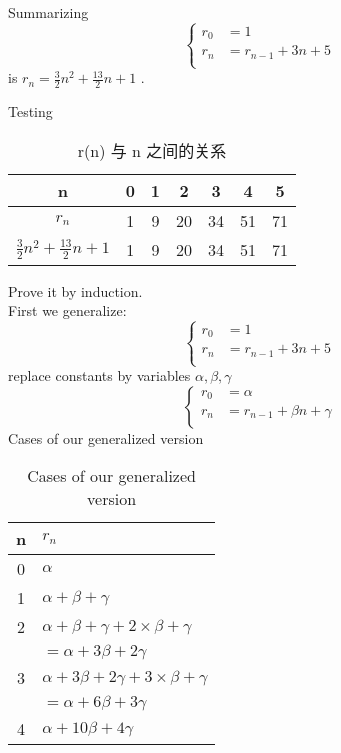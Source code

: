 \documentclass[mode=geye]{elegantnote}
\begin{document}
Summarizing 
\begin{equation*}
    \left\{
        \begin{array}{ll}
            r_0 &= 1\\
            r_n &= r_{n-1}+3n+5\\
        \end{array}
    \right.
\end{equation*}
is $ r_n=\frac{3}{2}n^2+\frac{13}{2}n+1 $ .

Testing
\begin{table}[htbp]
	\centering
	\small
	\caption{r(n) 与 n 之间的关系}
	\begin{tabular}{c|ccc ccc}
		\toprule
		n & 0 & 1 & 2 & 3 & 4 & 5 \\  
		\midrule
		$ r_n $ & 1 & 9 & 20 & 34 & 51 & 71\\
        $ \frac{3}{2}n^2+\frac{13}{2}n+1 $ & 1 & 9 & 20 & 34 & 51 & 71\\
		\bottomrule
	\end{tabular}%
	\label{tab:rnCompare}%
\end{table}%

Prove it by induction.\\
First we generalize:
\begin{equation*}
    \left\{
        \begin{array}{ll}
            r_0 &= 1\\
            r_n &= r_{n-1}+3n+5\\
        \end{array}
    \right.
\end{equation*}
replace constants by variables $ \alpha, \beta,\gamma $ 
\begin{equation*}
    \left\{
        \begin{array}{ll}
            r_0 &= \alpha\\
            r_n &= r_{n-1}+\beta n+\gamma\\
        \end{array}
    \right.
\end{equation*}
Cases of our generalized version
\begin{table}[htbp]
	\centering
	\small
	\caption{Cases of our generalized version}
	\begin{tabular}{cl}
		\toprule
		n & $ r_n $ \\  
		\midrule
        0   & $ \alpha $     \\
        1   & $ \alpha + \beta + \gamma $    \\
        2   & $ \alpha + \beta + \gamma + 2\times \beta + \gamma  $   \\
            & $ = \alpha + 3\beta + 2\gamma $ \\
        3   & $ \alpha + 3\beta + 2\gamma + 3\times \beta + \gamma $ \\
            & $ = \alpha + 6\beta + 3\gamma $   \\
        4   & $ \alpha + 10\beta + 4\gamma $ \\
		\bottomrule
	\end{tabular}%
	\label{tab:casesofgene}%
\end{table}%
\end{document}
